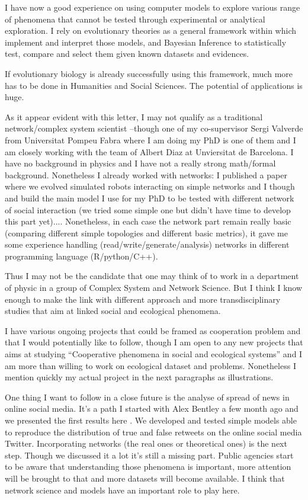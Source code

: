 \documentclass[10pt]{article}
\begin{document}
I have now a good experience on using computer models to explore various range of phenomena that cannot be tested through experimental or analytical exploration. I rely on evolutionary theories as a general framework within which implement and interpret those models, and Bayesian Inference to statistically test, compare and select them given known datasets and evidences.

If evolutionary biology is already successfully using this framework, much more has to be done in Humanities and Social Sciences. The potential of applications is huge. 

As it appear evident with this letter, I may not qualify as a traditional network/complex system scientist --though one of my co-supervisor Sergi Valverde from Universitat Pompeu Fabra where I am doing my PhD is one of them and I am closely working with the team of Albert Diaz at Unviersitat de Barcelona. I have no background in physics and I have not a really strong math/formal background. Nonetheless I already worked with networks: I published a paper where we evolved simulated robots interacting on simple networks and I though and build the main model I use for my PhD to be tested with different network of social interaction (we tried some simple one but didn't have time to develop this part yet).... Nonetheless, in each case the network part remain really basic (comparing different simple topologies and different basic metrics), it gave me some experience handling (read/write/generate/analysis) networks in different programming language (R/python/C++).

Thus I may not be the candidate that one may think of to work in a department of physic in a group of Complex System and Network Science. But I think I know enough to make the link with different approach and more transdisciplinary studies that aim at linked social and ecological phenomena.

I have various ongoing projects that could be framed as cooperation problem and that I would potentially like to follow, though I am open to any new projects that aims at studying ``Cooperative phenomena in social and ecological systems'' and I am more than willing to work on ecological dataset and problems. Nonetheless I mention quickly my actual project in the next paragraphs as illustrations.
 

One thing I want to follow in a close future is the analyse of spread of news in online social media. 
It's a path I started with Alex Bentley a few month ago and we presented the first results here \cite{carrignon2018}.  
We developed and tested simple models able to reproduce the distribution of true and false retweets on the online social media Twitter. Incorporating networks (the real ones or theoretical ones) is the next step. Though we discussed it a lot it's still a missing part. Public agencies start to be aware that understanding those phenomena is important, more attention will be brought to that and more datasets will become available. I think that network science and models have an important role to play here.
\end{document}
